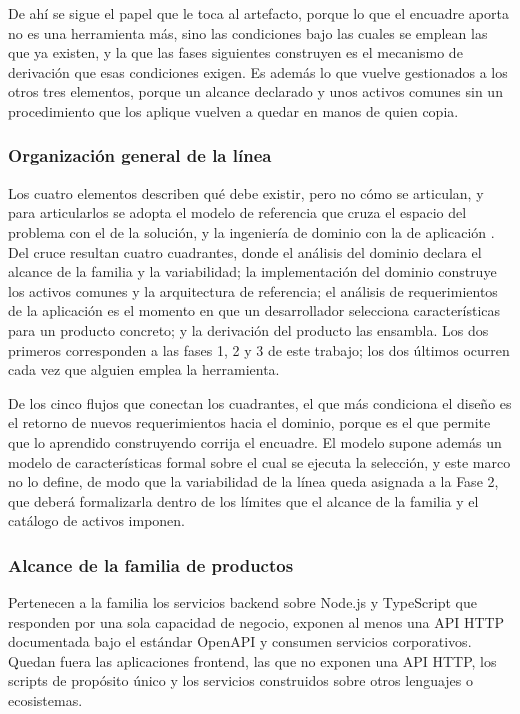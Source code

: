 De ahí se sigue el papel que le toca al artefacto, porque lo que el encuadre
aporta no es una herramienta más, sino las condiciones bajo las cuales se
emplean las que ya existen, y la que las fases siguientes construyen es el
mecanismo de derivación que esas condiciones exigen. Es además lo que vuelve
gestionados a los otros tres elementos, porque un alcance declarado y unos
activos comunes sin un procedimiento que los aplique vuelven a quedar en manos
de quien copia.

\subsubsection*{Organización general de la línea}

Los cuatro elementos describen qué debe existir, pero no cómo se articulan, y
para articularlos se adopta el modelo de referencia que cruza el espacio del
problema con el de la solución, y la ingeniería de dominio con la de
aplicación \citep{Apel2013}. Del cruce resultan cuatro cuadrantes, donde el
análisis del dominio declara el alcance de la familia y la variabilidad; la
implementación del dominio construye los activos comunes y la arquitectura de
referencia; el análisis de requerimientos de la aplicación es el momento en
que un desarrollador selecciona características para un producto concreto; y
la derivación del producto las ensambla. Los dos primeros corresponden a las
fases 1, 2 y 3 de este trabajo; los dos últimos ocurren cada vez que alguien
emplea la herramienta.

De los cinco flujos que conectan los cuadrantes, el que más condiciona el
diseño es el retorno de nuevos requerimientos hacia el dominio, porque es el
que permite que lo aprendido construyendo corrija el encuadre. El modelo
supone además un modelo de características formal sobre el cual se ejecuta la
selección, y este marco no lo define, de modo que la variabilidad de la línea
queda asignada a la Fase 2, que deberá formalizarla dentro de los límites que
el alcance de la familia y el catálogo de activos imponen.

\subsubsection*{Alcance de la familia de productos}

Pertenecen a la familia los servicios backend sobre Node.js y TypeScript que
responden por una sola capacidad de negocio, exponen al menos una API HTTP
documentada bajo el estándar OpenAPI y consumen servicios corporativos. Quedan
fuera las aplicaciones frontend, las que no exponen una API HTTP, los scripts
de propósito único y los servicios construidos sobre otros lenguajes o
ecosistemas.

